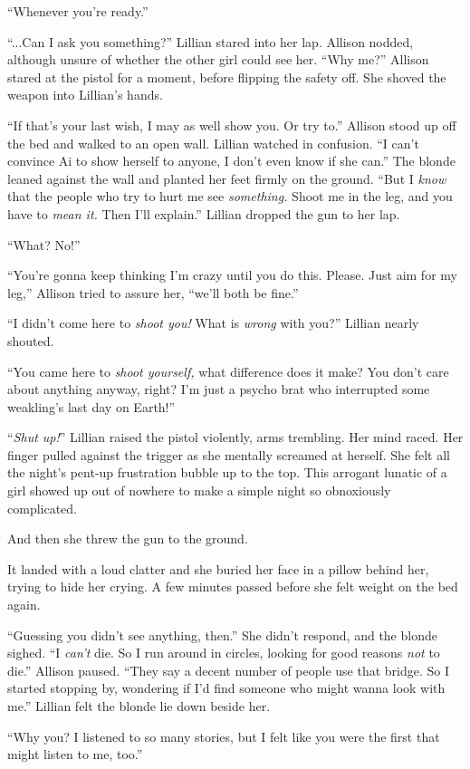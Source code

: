 \begin{Standard}
``Whenever you're ready.''

``...Can I ask you something?'' Lillian stared into her lap. Allison nodded, although unsure
of whether the other girl could see her. ``Why me?'' Allison stared at the pistol for a moment,
before flipping the safety off. She shoved the weapon into Lillian's hands.

``If that's your last wish, I may as well show you. Or try to.'' Allison stood up off the bed and
walked to an open wall. Lillian watched in confusion. ``I can't convince Ai to show herself to anyone,
I don't even know if she can.'' The blonde leaned against the wall and planted her feet firmly on the ground.
``But I \emph{know} that the people who try to hurt me see \emph{something.} Shoot me in the leg, and you have
to \emph{mean it.} Then I'll explain.'' Lillian dropped the gun to her lap.

``What? No!''

``You're gonna keep thinking I'm crazy until you do this. Please. Just aim for my leg,'' Allison tried
to assure her, ``we'll both be fine.''

``I didn't come here to \emph{shoot you!} What is \emph{wrong} with you?'' Lillian nearly shouted.

``You came here to \emph{shoot yourself,} what difference does it make? You don't care about anything
anyway, right? I'm just a psycho brat who interrupted some weakling's last day on Earth!''

``\emph{Shut up!}'' Lillian raised the pistol violently, arms trembling. Her mind raced. Her finger
pulled against the trigger as she mentally screamed at herself. She felt all the night's pent-up
frustration bubble up to the top. This arrogant lunatic of a girl showed up out of nowhere to make
a simple night so obnoxiously complicated.

And then she threw the gun to the ground.

It landed with a loud clatter and she buried her face in a pillow behind her, trying to hide
her crying. A few minutes passed before she felt weight on the bed again.

``Guessing you didn't see anything, then.'' She didn't respond, and the blonde sighed.
``I \emph{can't} die. So I run around in circles, looking for good reasons \emph{not} to die.''
Allison paused. ``They say a decent number of people use that bridge. So I started stopping by,
wondering if I'd find someone who might wanna look with me.'' Lillian felt the blonde lie down beside her.

``Why you? I listened to so many stories, but I felt like you were the first that
might listen to me, too.''
\end{Standard}
